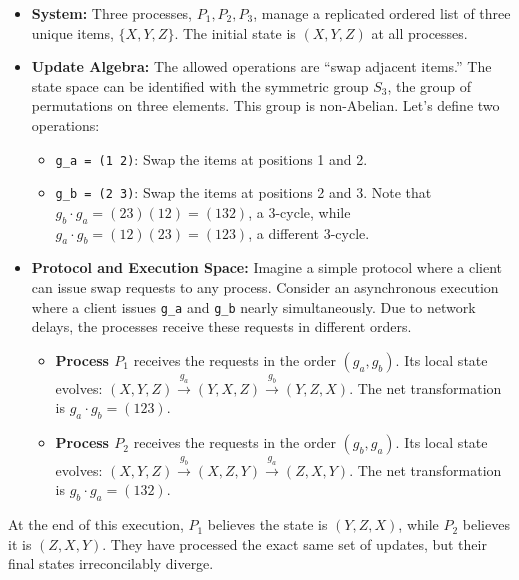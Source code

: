 \documentclass[
]{article}
\providecommand{\tightlist}{%
  \setlength{\itemsep}{0pt}\setlength{\parskip}{0pt}}
\begin{document}
\begin{itemize}
\tightlist
\item
  \textbf{System:} Three processes, \(P_1, P_2, P_3\), manage a
  replicated ordered list of three unique items, \(\{X, Y, Z\}\). The
  initial state is \((X, Y, Z)\) at all processes.
\item
  \textbf{Update Algebra:} The allowed operations are ``swap adjacent
  items.'' The state space can be identified with the symmetric group
  \(S_3\), the group of permutations on three elements. This group is
  non-Abelian. Let's define two operations:

  \begin{itemize}
  \tightlist
  \item
    \texttt{g\_a\ =\ (1\ 2)}: Swap the items at positions 1 and 2.
  \item
    \texttt{g\_b\ =\ (2\ 3)}: Swap the items at positions 2 and 3. Note
    that \(g_b \cdot g_a = (2 3)(1 2) = (1 3 2)\), a 3-cycle, while
    \(g_a \cdot g_b = (1 2)(2 3) = (1 2 3)\), a different 3-cycle.
  \end{itemize}
\item
  \textbf{Protocol and Execution Space:} Imagine a simple protocol where
  a client can issue swap requests to any process. Consider an
  asynchronous execution where a client issues \texttt{g\_a} and
  \texttt{g\_b} nearly simultaneously. Due to network delays, the
  processes receive these requests in different orders.

  \begin{itemize}
  \tightlist
  \item
    \textbf{Process \(P_1\)} receives the requests in the order
    \((g_a, g_b)\). Its local state evolves:
    \((X, Y, Z) \xrightarrow{g_a} (Y, X, Z) \xrightarrow{g_b} (Y, Z, X)\).
    The net transformation is \(g_a \cdot g_b = (1 2 3)\).
  \item
    \textbf{Process \(P_2\)} receives the requests in the order
    \((g_b, g_a)\). Its local state evolves:
    \((X, Y, Z) \xrightarrow{g_b} (X, Z, Y) \xrightarrow{g_a} (Z, X, Y)\).
    The net transformation is \(g_b \cdot g_a = (1 3 2)\).
  \end{itemize}
\end{itemize}

At the end of this execution, \(P_1\) believes the state is
\((Y, Z, X)\), while \(P_2\) believes it is \((Z, X, Y)\). They have
processed the exact same set of updates, but their final states
irreconcilably diverge.
\end{document}
